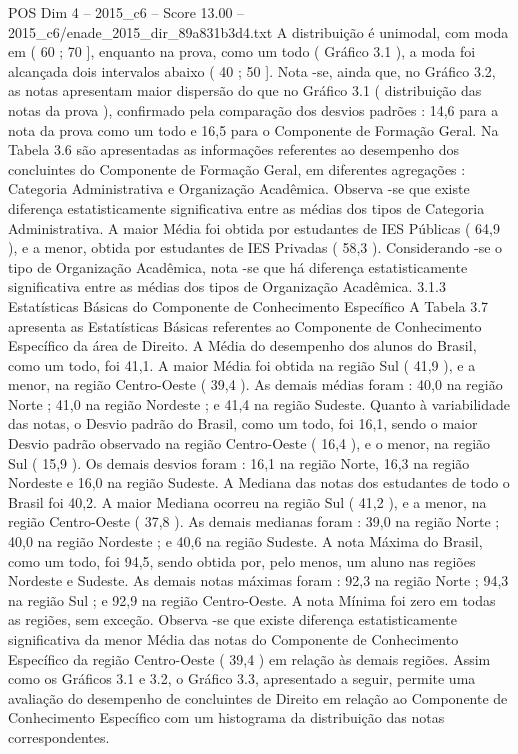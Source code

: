 \begin{textsample}{POS Dim 4 – 2015\_c6 – Score 13.00 – 2015\_c6/enade\_2015\_dir\_89a831b3d4.txt}
A distribuição é unimodal, com moda em ( 60 ; 70 ], enquanto na prova, como um todo ( Gráfico 3.1 ), a moda foi alcançada dois intervalos abaixo ( 40 ; 50 ].
Nota -se, ainda que, no Gráfico 3.2, as notas apresentam maior dispersão do que no Gráfico 3.1 ( distribuição das notas da prova ), confirmado pela comparação dos desvios padrões : 14,6 para a nota da prova como um todo e 16,5 para o Componente de Formação Geral.
Na Tabela 3.6 são apresentadas as informações referentes ao desempenho dos concluintes do Componente de Formação Geral, em diferentes agregações : Categoria Administrativa e Organização Acadêmica.
Observa -se que existe diferença estatisticamente significativa entre as médias dos tipos de Categoria Administrativa.
A maior Média foi obtida por estudantes de IES Públicas ( 64,9 ), e a menor, obtida por estudantes de IES Privadas ( 58,3 ).
Considerando -se o tipo de Organização Acadêmica, nota -se que há diferença estatisticamente significativa entre as médias dos tipos de Organização Acadêmica. 3.1.3 Estatísticas Básicas do Componente de Conhecimento Específico A Tabela 3.7 apresenta as Estatísticas Básicas referentes ao Componente de Conhecimento Específico da área de Direito.
A Média do desempenho dos alunos do Brasil, como um todo, foi 41,1.
A maior Média foi obtida na região Sul ( 41,9 ), e a menor, na região Centro-Oeste ( 39,4 ).
As demais médias foram : 40,0 na região Norte ; 41,0 na região Nordeste ; e 41,4 na região Sudeste.
Quanto à variabilidade das notas, o Desvio padrão do Brasil, como um todo, foi 16,1, sendo o maior Desvio padrão observado na região Centro-Oeste ( 16,4 ), e o menor, na região Sul ( 15,9 ).
Os demais desvios foram : 16,1 na região Norte, 16,3 na região Nordeste e 16,0 na região Sudeste.
A Mediana das notas dos estudantes de todo o Brasil foi 40,2.
A maior Mediana ocorreu na região Sul ( 41,2 ), e a menor, na região Centro-Oeste ( 37,8 ).
As demais medianas foram : 39,0 na região Norte ; 40,0 na região Nordeste ; e 40,6 na região Sudeste.
A nota Máxima do Brasil, como um todo, foi 94,5, sendo obtida por, pelo menos, um aluno nas regiões Nordeste e Sudeste.
As demais notas máximas foram : 92,3 na região Norte ; 94,3 na região Sul ; e 92,9 na região Centro-Oeste.
A nota Mínima foi zero em todas as regiões, sem exceção.
Observa -se que existe diferença estatisticamente significativa da menor Média das notas do Componente de Conhecimento Específico da região Centro-Oeste ( 39,4 ) em relação às demais regiões.
Assim como os Gráficos 3.1 e 3.2, o Gráfico 3.3, apresentado a seguir, permite uma avaliação do desempenho de concluintes de Direito em relação ao Componente de Conhecimento Específico com um histograma da distribuição das notas correspondentes.

\end{textsample}
